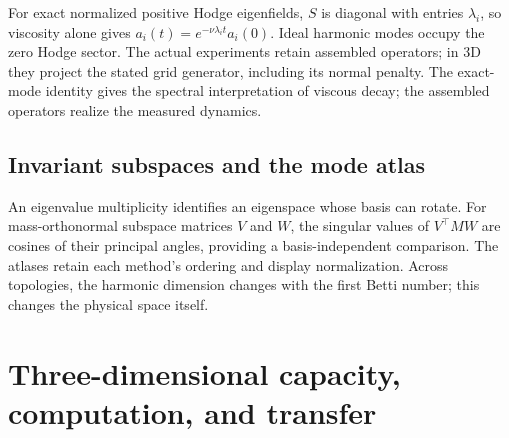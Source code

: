 For exact normalized positive Hodge eigenfields, $S$ is diagonal with entries $\lambda_i$, so viscosity alone gives $a_i(t)=e^{-\nu\lambda_i t}a_i(0)$. Ideal harmonic modes occupy the zero Hodge sector. The actual experiments retain assembled operators; in 3D they project the stated grid generator, including its normal penalty. The exact-mode identity gives the spectral interpretation of viscous decay; the assembled operators realize the measured dynamics.

\subsection{Invariant subspaces and the mode atlas}
An eigenvalue multiplicity identifies an eigenspace whose basis can rotate. For mass-orthonormal subspace matrices $V$ and $W$, the singular values of $V^{\top}M W$ are cosines of their principal angles, providing a basis-independent comparison. The atlases retain each method's ordering and display normalization. Across topologies, the harmonic dimension changes with the first Betti number; this changes the physical space itself.

\section{Three-dimensional capacity, computation, and transfer}
\label{app:3d-controls}
